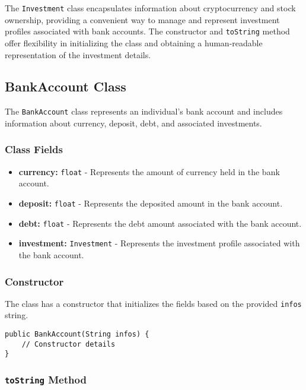 \documentclass{article}
\begin{document}
The \texttt{Investment} class encapsulates information about cryptocurrency and stock ownership, providing a convenient way to manage and represent investment profiles associated with bank accounts. The constructor and \texttt{toString} method offer flexibility in initializing the class and obtaining a human-readable representation of the investment details.

\subsection{BankAccount Class}\label{bank-account}

The \texttt{BankAccount} class represents an individual's bank account and includes information about currency, deposit, debt, and associated investments.

\subsubsection{Class Fields}

\begin{itemize}
    \item \textbf{currency:} \texttt{float} - Represents the amount of currency held in the bank account.
    
    \item \textbf{deposit:} \texttt{float} - Represents the deposited amount in the bank account.
    
    \item \textbf{debt:} \texttt{float} - Represents the debt amount associated with the bank account.
    
    \item \textbf{investment:} \texttt{Investment} - Represents the investment profile associated with the bank account.
\end{itemize}

\subsubsection{Constructor}

The class has a constructor that initializes the fields based on the provided \texttt{infos} string.

\begin{verbatim}
public BankAccount(String infos) {
    // Constructor details
}
\end{verbatim}

\subsubsection{\texttt{toString} Method}
\end{document}
